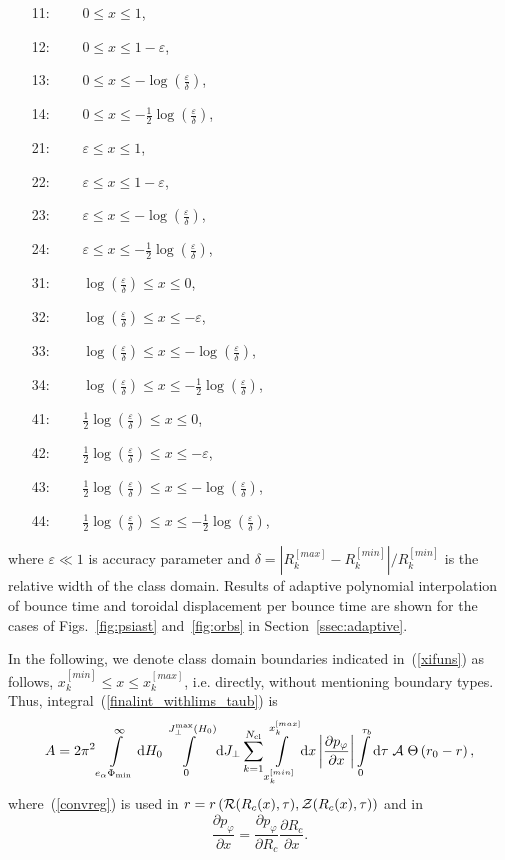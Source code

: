 \documentclass[preprint,prb,aps]{revtex4-1}
\newcommand{\be}[1]{\begin{equation} \label{#1}}
\newcommand{\ee}{\end{equation}}
\newcommand{\eq}[1]{(\ref{#1})}
\newcommand{\difp}[2]{\frac{\partial #1}{\partial #2}}
\newcommand{\rd}{{\rm d}}
\newcommand{\cA}{{\cal A}}
\begin{document}
\begin{itemize}
\item[11:] $\qquad 0\le x \le 1$,
\item[12:] $\qquad 0\le x \le 1-\varepsilon$,
\item[13:] $\qquad 0\le x \le -\log\left(\frac{\varepsilon}{\delta}\right)$,
\item[14:] $\qquad 0\le x 
\le -\frac{1}{2}\log\left(\frac{\varepsilon}{\delta}\right)$,
\item[21:] $\qquad \varepsilon \le x \le 1$,
\item[22:] $\qquad \varepsilon \le x \le 1-\varepsilon$,
\item[23:] $\qquad \varepsilon \le x 
\le -\log\left(\frac{\varepsilon}{\delta}\right)$,
\item[24:] $\qquad \varepsilon \le x 
\le -\frac{1}{2}\log\left(\frac{\varepsilon}{\delta}\right)$,
\item[31:] $\qquad \log\left(\frac{\varepsilon}{\delta}\right) \le x \le 0$,
\item[32:] $\qquad \log\left(\frac{\varepsilon}{\delta}\right) 
\le x \le -\varepsilon$,
\item[33:] $\qquad \log\left(\frac{\varepsilon}{\delta}\right) \le x 
\le -\log\left(\frac{\varepsilon}{\delta}\right)$,
\item[34:] $\qquad \log\left(\frac{\varepsilon}{\delta}\right) \le x 
\le -\frac{1}{2}\log\left(\frac{\varepsilon}{\delta}\right)$,
\item[41:] $\qquad \frac{1}{2}\log\left(\frac{\varepsilon}{\delta}\right) \le x \le 0$,
\item[42:] $\qquad \frac{1}{2}\log\left(\frac{\varepsilon}{\delta}\right) 
\le x \le -\varepsilon$,
\item[43:] $\qquad \frac{1}{2}\log\left(\frac{\varepsilon}{\delta}\right) \le x 
\le -\log\left(\frac{\varepsilon}{\delta}\right)$,
\item[44:] $\qquad \frac{1}{2}\log\left(\frac{\varepsilon}{\delta}\right) \le x 
\le -\frac{1}{2}\log\left(\frac{\varepsilon}{\delta}\right)$,
\end{itemize}
where $\varepsilon \ll 1$ is accuracy parameter and 
$\delta = \left|R^{[max]}_k-R^{[min]}_k\right|/R^{[min]}_k$ is the relative width
of the class domain. Results of adaptive polynomial interpolation of bounce time
and toroidal displacement per bounce time are shown for the cases of 
Figs.~\ref{fig:psiast} and~\ref{fig:orbs} in Section~\ref{ssec:adaptive}.

In the following, we denote class domain boundaries indicated in~\eq{xifuns}
as follows, $x^{[min]}_k \le x \le x^{[max]}_k$, i.e. directly, without mentioning
boundary types. 
Thus, integral~\eq{finalint_withlims_taub} is
\be{finalint_over_classes}
A=2\pi^2 
\int\limits_{e_\alpha\Phi_{\rm min}}^\infty \rd H_0
\int\limits_0^{J_\perp^{\rm max}(H_0)} \rd J_\perp
\sum\limits_{k=1}^{N_{\rm cl}}
\int\limits_{x^{[min]}_k}^{x^{[max]}_k} \rd x
\left|\difp{p_\varphi}{x}\right|
\int\limits_0^{\tau_b} \rd \tau\;
\cA\;
\Theta\left(r_0-r\right),
\ee
where~\eq{convreg} is used in 
$r=r\left({\cal R}(R_c(x),\tau), {\cal Z}(R_c(x),\tau)\right)$ and in
$$
\difp{p_\varphi}{x}=\difp{p_\varphi}{R_c}\difp{R_c}{x}.
$$
\end{document}
